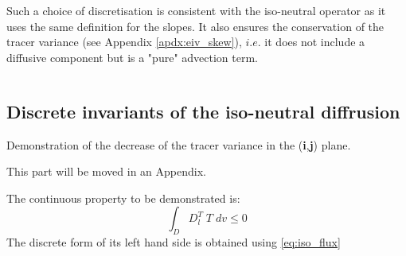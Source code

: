 \documentclass[../main/NEMO_manual]{subfiles}
\begin{document}
Such a choice of discretisation is consistent with the iso-neutral operator as
it uses the same definition for the slopes.
It also ensures the conservation of the tracer variance (see Appendix \autoref{apdx:eiv_skew}),
$i.e.$ it does not include a diffusive component but is a "pure" advection term.

$\ $\newpage      %
\subsection{Discrete invariants of the iso-neutral diffrusion}
\label{subsec:Gf_operator}

Demonstration of the decrease of the tracer variance in the (\textbf{i},\textbf{j}) plane. 

This part will be moved in an Appendix.

The continuous property to be demonstrated is:
\[
  \int_D  D_l^T \; T \;dv   \leq 0
\]
The discrete form of its left hand side is obtained using \autoref{eq:iso_flux}
\end{document}
